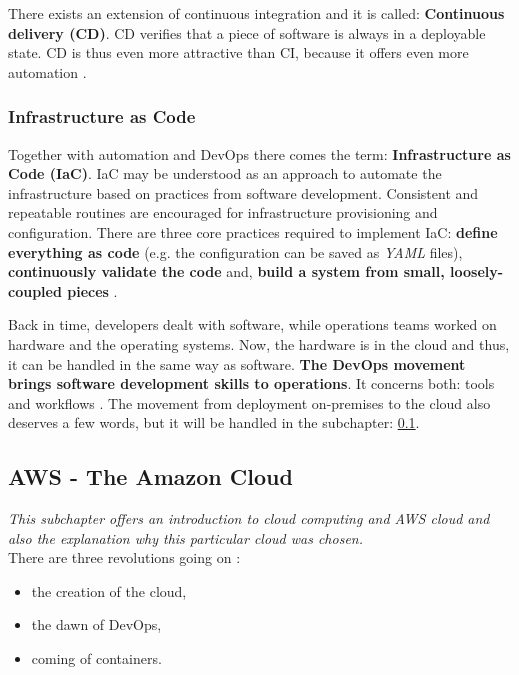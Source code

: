 There exists an extension of continuous integration and it is called: \textbf{Continuous delivery (CD)}. CD verifies that a piece of software is always in a deployable state. CD is thus even more attractive than CI, because it offers even more automation \cite{online-do-cicd}.

\subsubsection{Infrastructure as Code}
Together with automation and DevOps there comes the term: \textbf{Infrastructure as Code (IaC)}. IaC may be understood as an approach to automate the infrastructure based on practices from software development. Consistent and repeatable routines are encouraged for infrastructure provisioning and configuration. There are three core practices required to implement IaC: \textbf{define everything as code} (e.g. the configuration can be saved as \textit{YAML} files), \textbf{continuously validate the code} and, \textbf{build a system from small, loosely-coupled pieces} \cite{book-iac}.

Back in time, developers dealt with software, while operations teams worked on hardware and the operating systems. Now, the hardware is in the cloud and thus, it can be handled in the same way as software. \textbf{The DevOps movement brings software development skills to operations}. It concerns both: tools and workflows \cite{book-cndwk}. The movement from deployment on-premises to the cloud also deserves a few words, but it will be handled in the subchapter: \ref{section-aws}.

\subsection{AWS - The Amazon Cloud} \label{section-aws}
\textit{This subchapter offers an introduction to cloud computing and AWS cloud and also the explanation why this particular cloud was chosen.}
\\

There are three revolutions going on \cite{book-cndwk}:
\begin{itemize}
\item the creation of the cloud,
\item the dawn of DevOps,
\item coming of containers.
\end{itemize}

